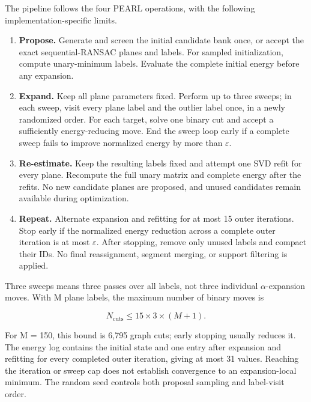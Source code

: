 The pipeline follows the four PEARL operations, with the following implementation-specific limits.

\begin{enumerate}
\item \textbf{Propose.} Generate and screen the initial candidate bank once, or accept the exact sequential-RANSAC planes and labels. For sampled initialization, compute unary-minimum labels. Evaluate the complete initial energy before any expansion.

\item \textbf{Expand.} Keep all plane parameters fixed. Perform up to three sweeps; in each sweep, visit every plane label and the outlier label once, in a newly randomized order. For each target, solve one binary cut and accept a sufficiently energy-reducing move. End the sweep loop early if a complete sweep fails to improve normalized energy by more than \(\varepsilon\).

\item \textbf{Re-estimate.} Keep the resulting labels fixed and attempt one SVD refit for every plane. Recompute the full unary matrix and complete energy after the refits. No new candidate planes are proposed, and unused candidates remain available during optimization.

\item \textbf{Repeat.} Alternate expansion and refitting for at most 15 outer iterations. Stop early if the normalized energy reduction across a complete outer iteration is at most \(\varepsilon\). After stopping, remove only unused labels and compact their IDs. No final reassignment, segment merging, or support filtering is applied.

\end{enumerate}

Three sweeps means three passes over all labels, not three individual \(\alpha\)-expansion moves. With M plane labels, the maximum number of binary moves is

\begin{equation}
N_{\mathrm{cuts}}\leq15\times3\times(M+1).
\label{eq:38}
\end{equation}

For M = 150, this bound is 6,795 graph cuts; early stopping usually reduces it. The energy log contains the initial state and one entry after expansion and refitting for every completed outer iteration, giving at most 31 values. Reaching the iteration or sweep cap does not establish convergence to an expansion-local minimum. The random seed controls both proposal sampling and label-visit order.

